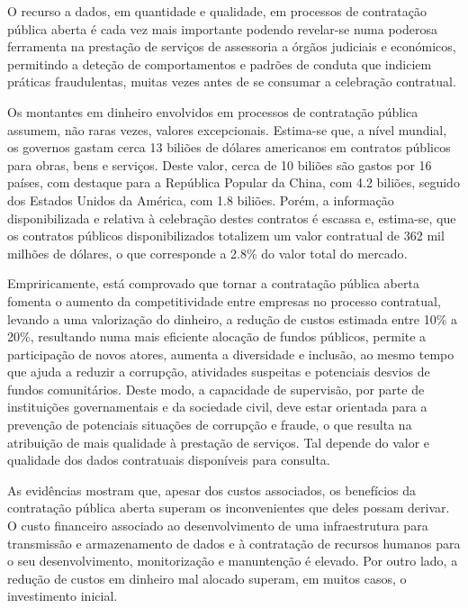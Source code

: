 O recurso a dados, em quantidade e qualidade, em processos de contratação pública aberta é cada vez mais importante podendo revelar-se numa poderosa ferramenta na prestação de serviços de assessoria a órgãos judiciais e económicos, permitindo a deteção de comportamentos e padrões de conduta que indiciem práticas fraudulentas, muitas vezes antes de se consumar a celebração contratual\cite{redflags_guide}.



Os montantes em dinheiro envolvidos em processos de contratação pública assumem, não raras vezes, valores excepcionais. Estima-se que, a nível mundial, os governos gastam cerca 13 biliões de dólares americanos em contratos públicos para obras, bens e serviços. Deste valor, cerca de 10 biliões são gastos por 16 países, com destaque para a República Popular da China, com 4.2 biliões, seguido dos Estados Unidos da América, com 1.8 biliões. Porém, a informação disponibilizada e relativa à celebração destes contratos é escassa e, estima-se, que os contratos públicos disponibilizados totalizem um valor contratual de 362 mil milhões de dólares, o que corresponde a 2.8\% do valor total do mercado\cite{redflags_guide}\cite{govspent}\cite{stateogp}.



Empriricamente, está comprovado que tornar a contratação pública aberta fomenta o aumento da competitividade entre empresas no processo contratual, levando a uma valorização do dinheiro, a redução de custos estimada entre 10\% a 20\%, resultando numa mais eficiente alocação de fundos públicos, permite a participação de novos atores, aumenta a diversidade e inclusão, ao mesmo tempo que ajuda a reduzir a corrupção, atividades suspeitas e potenciais desvios de fundos comunitários\cite{govspent}\cite{stateogp}. Deste modo, a capacidade de supervisão, por parte de instituições governamentais e da sociedade civil, deve estar orientada para a prevenção de potenciais situações de corrupção e fraude, o que resulta na atribuição de mais qualidade à prestação de serviços. Tal depende do valor e qualidade dos dados contratuais disponíveis para consulta.



As evidências mostram que, apesar dos custos associados, os benefícios da contratação pública aberta superam os inconvenientes que deles possam derivar. O custo financeiro associado ao desenvolvimento de uma infraestrutura para transmissão e armazenamento de dados e à contratação de recursos humanos para o seu desenvolvimento, monitorização e manuntenção é elevado. Por outro lado, a redução de custos em dinheiro mal alocado superam, em muitos casos, o investimento inicial\cite{stateogp}.


